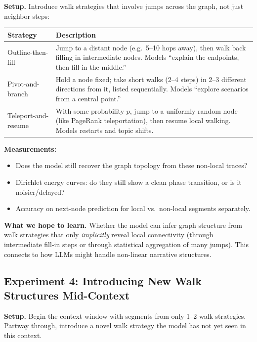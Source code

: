 \documentclass[11pt]{article}
\begin{document}
\textbf{Setup.} Introduce walk strategies that involve jumps across the graph, not just neighbor steps:

\begin{table}[h]
\centering
\begin{tabular}{@{}lp{10cm}@{}}
\toprule
\textbf{Strategy} & \textbf{Description} \\
\midrule
Outline-then-fill & Jump to a distant node (e.g.\ 5--10 hops away), then walk back filling in intermediate nodes. Models ``explain the endpoints, then fill in the middle.'' \\
Pivot-and-branch & Hold a node fixed; take short walks (2--4 steps) in 2--3 different directions from it, listed sequentially. Models ``explore scenarios from a central point.'' \\
Teleport-and-resume & With some probability $p$, jump to a uniformly random node (like PageRank teleportation), then resume local walking. Models restarts and topic shifts. \\
\bottomrule
\end{tabular}
\end{table}

\textbf{Measurements:}
\begin{itemize}
    \item Does the model still recover the graph topology from these non-local traces?
    \item Dirichlet energy curves: do they still show a clean phase transition, or is it noisier/delayed?
    \item Accuracy on next-node prediction for local vs.\ non-local segments separately.
\end{itemize}

\textbf{What we hope to learn.} Whether the model can infer graph structure from walk strategies that only \emph{implicitly} reveal local connectivity (through intermediate fill-in steps or through statistical aggregation of many jumps). This connects to how LLMs might handle non-linear narrative structures.

\subsection{Experiment 4: Introducing New Walk Structures Mid-Context}

\textbf{Setup.} Begin the context window with segments from only 1--2 walk strategies. Partway through, introduce a novel walk strategy the model has not yet seen in this context.
\end{document}
